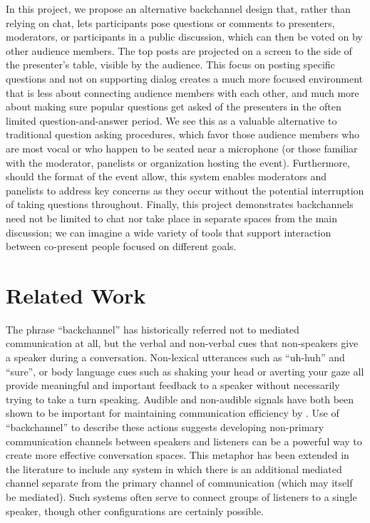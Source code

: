 In this project, we propose an alternative backchannel design that, rather than relying on chat, lets participants pose questions or comments to presenters, moderators, or participants in a public discussion, which can then be voted on by other audience members. The top posts are projected on a screen to the side of the presenter's table, visible by the audience. This focus on posting specific questions and not on supporting dialog creates a much more focused environment that is less about connecting audience members with each other, and much more about making sure popular questions get asked of the presenters in the often limited question-and-answer period. We see this as a valuable alternative to traditional question asking procedures, which favor those audience members who are most vocal or who happen to be seated near a microphone (or those familiar with the moderator, panelists or organization hosting the event). Furthermore, should the format of the event allow, this system enables moderators and panelists to address key concerns as they occur without the potential interruption of taking questions throughout. Finally, this project demonstrates backchannels need not be limited to chat nor take place in separate spaces from the main discussion; we can imagine a wide variety of tools that support interaction between co-present people focused on different goals.

\section{Related Work}

The phrase ``backchannel'' has historically referred not to mediated communication at all, but the verbal and non-verbal cues that non-speakers give a speaker during a conversation. Non-lexical utterances such as ``uh-huh'' and ``sure'', or body language cues such as shaking your head or averting your gaze all provide meaningful and important feedback to a speaker without necessarily trying to take a turn speaking. Audible and non-audible signals have both been shown to be important for maintaining communication efficiency by \citet{Krauss:1977bu}. Use of ``backchannel'' to describe these actions suggests developing non-primary communication channels between speakers and listeners can be a powerful way to create more effective conversation spaces. This metaphor has been extended in the literature to include any system in which there is an additional mediated channel separate from the primary channel of communication (which may itself be mediated). Such systems often serve to connect groups of listeners to a single speaker, though other configurations are certainly possible.

